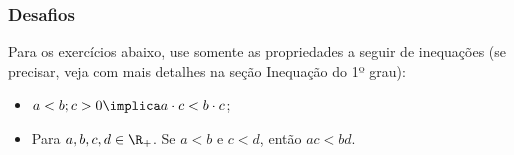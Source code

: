 
\begin{frame}
\frametitle{Desafios} 

Para os exercícios abaixo, use somente as propriedades a seguir de inequações (se precisar, veja com mais detalhes na seção Inequação do 1º grau):
\begin{itemize}
	\item $a < b ; c>0 \implica a \cdot c < b \cdot c$;
	\item Para $a, b, c, d \in \R_+$. Se $a< b$ e $c< d$, então $ac < bd$.
\end{itemize}



\end{frame}